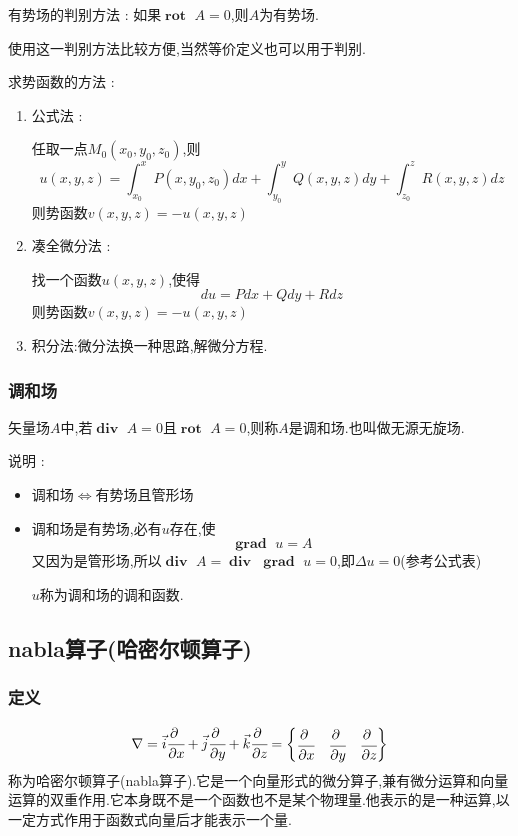 \documentclass[UTF8,12pt]{ctexbook}
\newcommand{\definiteIntegral}[2]{\int^{#1}_{#2}}
\newcommand{\spaceline}{\\\indent}
\newcommand{\partialDerivativeFrac}[2]{\cfrac{\partial #1}{\partial #2}}
\DeclareMathOperator{\divergenceText}{\mathbf{div}\ }
\DeclareMathOperator{\curlRotText}{\mathbf{rot}\ }
\DeclareMathOperator{\gradText}{\mathbf{grad}\ }
\begin{document}
{{{{{      有势场的判别方法 : 如果$\curlRotText A = 0$,则$A$为有势场.

      使用这一判别方法比较方便,当然等价定义也可以用于判别.\spaceline

      求势函数的方法 :
      \begin{enumerate}
        \item {
              公式法 :

              任取一点$M_0(x_0,y_0,z_0)$,则$$
                u(x,y,z) = \definiteIntegral{x}{x_0}P(x,y_0,z_0)dx + \definiteIntegral{y}{y_0}Q(x,y,z)dy + \definiteIntegral{z}{z_0}R(x,y,z)dz %
              $$
              则势函数$v(x,y,z) = -u(x,y,z)$
              }
        \item {
              凑全微分法 :

              找一个函数$u(x,y,z)$,使得$$
                du = Pdx + Qdy + Rdz
              $$
              则势函数$v(x,y,z) = -u(x,y,z)$
              }
        \item 积分法:微分法换一种思路,解微分方程.
      \end{enumerate}
    }%

    \subsubsection{调和场}{
      矢量场$A$中,若$\divergenceText A = 0$且$\curlRotText A = 0$,则称$A$是调和场.也叫做无源无旋场.

      说明 :
      \begin{itemize}
        \item 调和场$\Leftrightarrow$有势场且管形场
        \item {
              调和场是有势场,必有$u$存在,使$$
                \gradText u = A
              $$
              又因为是管形场,所以$\divergenceText A = \divergenceText\gradText u = 0$,即$\Delta u = 0$(参考公式表)

              $u$称为调和场的调和函数.
              }
      \end{itemize}
    }%

  }%

  \subsection{nabla算子(哈密尔顿算子)}{

    \subsubsection{定义}{
      $$
        \nabla = \vec{i}\partialDerivativeFrac{\ }{x} + \vec{j}\partialDerivativeFrac{\ }{y} + \vec{k}\partialDerivativeFrac{\ }{z} = \begin{Bmatrix}
          \partialDerivativeFrac{\ }{x} & \partialDerivativeFrac{\ }{y} & \partialDerivativeFrac{\ }{z}
        \end{Bmatrix}
      $$
      称为哈密尔顿算子(nabla算子).它是一个向量形式的微分算子,兼有微分运算和向量运算的双重作用.它本身既不是一个函数也不是某个物理量.他表示的是一种运算,以一定方式作用于函数式向量后才能表示一个量.
    }%

}}}}
\end{document}
